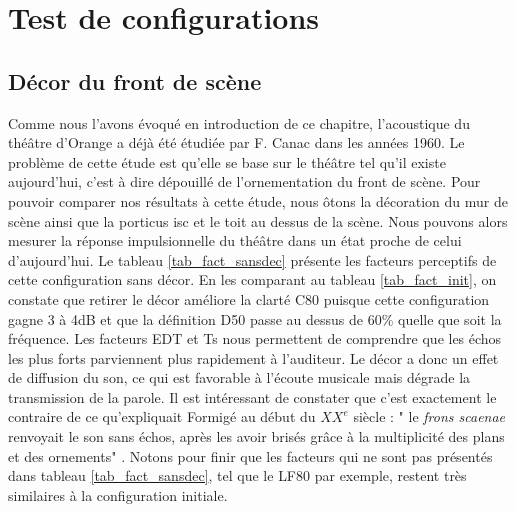 		
\chapter{Test de configurations}
	\minitoc
	\newpage

\section{Décor du front de scène}

Comme nous l'avons évoqué en introduction de ce chapitre, l'acoustique du théâtre d'Orange a déjà été étudiée par F. Canac dans les années 1960. Le problème de cette étude est qu'elle se base sur le théâtre tel qu'il existe aujourd'hui, c'est à dire dépouillé de l'ornementation du front de scène. Pour pouvoir comparer nos résultats à cette étude, nous ôtons la décoration du mur de scène ainsi que la \gls{porticus isc} et le toit au dessus de la scène. Nous pouvons alors mesurer la réponse impulsionnelle du théâtre dans un état proche de celui d'aujourd'hui. Le tableau \ref{tab_fact_sansdec} présente les facteurs perceptifs de cette configuration sans décor. En les comparant au tableau \ref{tab_fact_init}, on constate que retirer le décor améliore la clarté \gls{C80} puisque cette configuration gagne 3 à 4dB et que la définition \gls{D50} passe au dessus de 60\% quelle que soit la fréquence. Les facteurs \gls{EDT} et \gls{Ts} nous permettent de comprendre que les échos les plus forts parviennent plus rapidement à l'auditeur. Le décor a donc un effet de diffusion du son, ce qui est favorable à l'écoute musicale mais dégrade la transmission de la parole. Il est intéressant de constater que c'est exactement le contraire de ce qu'expliquait Formigé au début du $XX^e$ siècle : " le \textit{frons scaenae} renvoyait le son sans échos, après les avoir brisés grâce à la multiplicité des plans et des ornements" \cite[p.43]{formige}. Notons pour finir que les facteurs qui ne sont pas présentés dans tableau \ref{tab_fact_sansdec}, tel que le \gls{LF80} par exemple, restent très similaires à la configuration initiale.%



